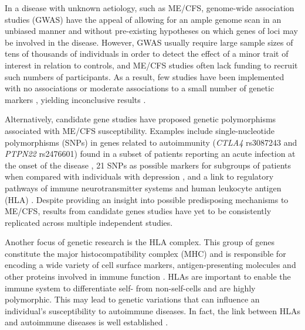 In a disease with unknown aetiology, such as ME/CFS, genome-wide association studies (GWAS) have the appeal of allowing for an ample genome scan in an unbiased manner and without pre-existing hypotheses on which genes of loci may be involved in the disease.
However, GWAS usually require large sample sizes of tens of thousands of individuals in order to detect the effect of a minor trait of interest in relation to controls, and ME/CFS studies often lack funding to recruit such numbers of participants.
As a result, few studies have been implemented with no associations \citep{hajdarevic2022GeneticAssociation} or moderate associations to a small number of genetic markers \citep{smith2011ConvergentGenomic, schlauch2016GenomewideAssociation}, yielding inconclusive results \citep{grabowska2020ReviewQuality}.


Alternatively, candidate gene studies have proposed genetic polymorphisms associated with ME/CFS susceptibility.
Examples include single-nucleotide polymorphisms (SNPs) in genes related to autoimmunity (\textit{CTLA4} rs3087243 and \textit{PTPN22} rs2476601) found in a subset of patients reporting an acute infection at the onset of the disease \citep{steiner2020AutoimmunityRelatedRisk}, 21 SNPs as possible markers for subgroups of patients when compared with individuals with depression \citep{shimosakoUseSinglenucleotidePolymorphisms2014}, and a link to regulatory pathways of immune neurotransmitter systems and human leukocyte antigen (HLA) \citep{wang2017SystematicReview}.
Despite providing an insight into possible predisposing mechanisms to ME/CFS, results from candidate genes studies have yet to be consistently replicated across multiple independent studies.


Another focus of genetic research is the HLA complex.
This group of genes constitute the major histocompatibility complex (MHC) and is responsible for encoding a wide variety of cell surface markers, antigen-presenting molecules and other proteins involved in immune function \citep{janeway2017Immunology}.
HLAs are important to enable the immune system to differentiate self- from non-self-cells and are highly polymorphic.
This may lead to genetic variations that can influence an individual's susceptibility to autoimmune diseases.
In fact, the link between HLAs and autoimmune diseases is well established \citep{trowsdale2013MajorHistocompatibility, cruz-tapias2013HLAAssociation, matzaraki2017MHCLocus}.

